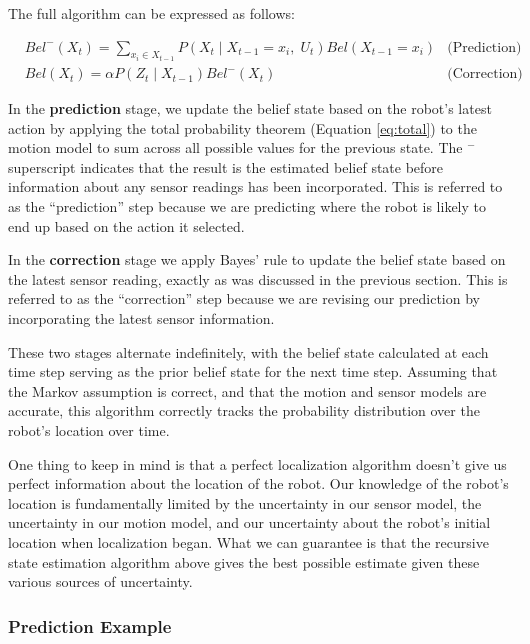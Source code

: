 The full  algorithm can be expressed
as follows:

\begin{align}
  &Bel^{-}(X_t) = \sum_{x_i \in X_{t-1}} P(X_t \mid X_{t-1} = x_i,\; U_{t}) Bel(X_{t-1}=x_i) & \text{(Prediction)}\\
  &Bel(X_t) = \alpha P(Z_t \mid X_{t-1}) Bel^{-}(X_t) & \text{(Correction)}
\end{align}

In the \textbf{prediction} stage, we update the belief state based on
the robot's latest action by applying the total probability theorem
(Equation \ref{eq:total}) to the motion model to sum across all
possible values for the previous state.  The ${}^-$ superscript
indicates that the result is the estimated belief state before
information about any sensor readings has been incorporated.  This is
referred to as the ``prediction'' step because we are predicting where
the robot is likely to end up based on the action it selected.


In the \textbf{correction} stage we apply Bayes' rule to update the
belief state based on the latest sensor reading, exactly as was
discussed in the previous section. This is referred to as the
``correction'' step because we are revising our prediction by
incorporating the latest sensor information.

These two stages alternate indefinitely, with the belief state
calculated at each time step serving as the prior belief state for the
next time step.  Assuming that the Markov assumption is correct, and
that the motion and sensor models are accurate, this algorithm
correctly tracks the probability distribution over the robot's
location over time.

One thing to keep in mind is that a perfect localization algorithm
doesn't give us perfect information about the location of the
robot. Our knowledge of the robot's location is fundamentally limited
by the uncertainty in our sensor model, the uncertainty in our motion
model, and our uncertainty about the robot's initial location when
localization began.  What we can guarantee is that the recursive state
estimation algorithm above gives the best possible estimate given
these various sources of uncertainty.


\subsubsection{Prediction Example}


